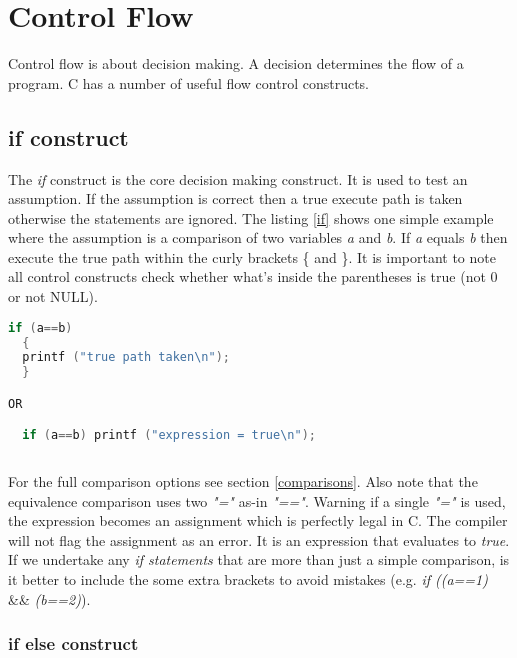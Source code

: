 \section{Control Flow}

Control flow is about decision making. A decision determines the flow of a program. C has a number of useful flow control constructs.

\subsection{if construct} \label{if construct}


The \textit{if} construct is the core decision making construct. It is used to test an assumption. If the assumption is correct then a true execute path is taken otherwise the statements are ignored. The listing \ref{if} shows one simple example where the assumption is a comparison of two variables \textit{a} and \textit{b}. If \textit{a} equals \textit{b} then execute the true path within the curly brackets \{ and \}. It is important to note all control constructs check whether what’s inside the parentheses is true (not 0 or not NULL).\\

\begin{lstlisting}[language=C,showstringspaces=false,caption={Syntax if statement},captionpos=b,label=if]
  if (a==b)
  { 
  printf ("true path taken\n"); 
  }

OR

  if (a==b) printf ("expression = true\n");
    
\end{lstlisting}

For the full comparison options see section \ref{comparisons}. Also note that the equivalence comparison uses two \textit{"="} as-in \textit{"=="}. Warning if a single \textit{"="} is used, the expression becomes an assignment which is perfectly legal in C. The compiler will not flag the assignment as an error. It is an expression that evaluates to \textit{true}. If we undertake any \textit{if statements} that are more than just a simple comparison, is it better to include the some extra brackets to avoid mistakes (e.g. \textit{if ((a==1)} \&\& \textit{(b==2)}).
 
\subsubsection{if else construct}

